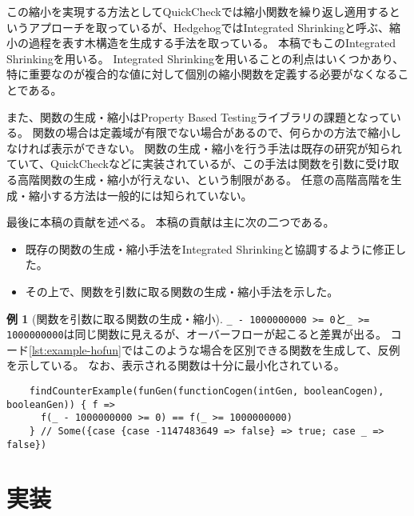 \documentclass[submit,PRO]{ipsj}
\theoremstyle{definition}
\newtheorem{example}{例}
\begin{document}
この縮小を実現する方法としてQuickCheckでは縮小関数を繰り返し適用するというアプローチを取っているが、Hedgehog\cite{hedgehog_online}ではIntegrated Shrinkingと呼ぶ、縮小の過程を表す木構造を生成する手法を取っている。
本稿でもこのIntegrated Shrinkingを用いる。
Integrated Shrinkingを用いることの利点はいくつかあり、特に重要なのが複合的な値に対して個別の縮小関数を定義する必要がなくなることである。

また、関数の生成・縮小はProperty Based Testingライブラリの課題となっている。
関数の場合は定義域が有限でない場合があるので、何らかの方法で縮小しなければ表示ができない。
関数の生成・縮小を行う手法は既存の研究\cite{claessen_shrinking_2012,koopman_automatic_2006}が知られていて、QuickCheckなどに実装されているが、この手法は関数を引数に受け取る高階関数の生成・縮小が行えない、という制限がある。
任意の高階高階を生成・縮小する方法は一般的には知られていない。

最後に本稿の貢献を述べる。
本稿の貢献は主に次の二つである。

\begin{itemize}
  \item 既存の関数の生成・縮小手法をIntegrated Shrinkingと協調するように修正した。
  \item その上で、関数を引数に取る関数の生成・縮小手法を示した。
\end{itemize}

\begin{example}[関数を引数に取る関数の生成・縮小]\label{exm:shrink}
\texttt{\_ - 1000000000 >= 0}と\texttt{\_ >= 1000000000}は同じ関数に見えるが、オーバーフローが起こると差異が出る。
コード\ref{lst:example-hofun}ではこのような場合を区別できる関数を生成して、反例を示している。
なお、表示される関数は十分に最小化されている。

\begin{listing*}[htb]
  \begin{verbatim}
    findCounterExample(funGen(functionCogen(intGen, booleanCogen), booleanGen)) { f =>
      f(_ - 1000000000 >= 0) == f(_ >= 1000000000)
    } // Some({case {case -1147483649 => false} => true; case _ => false})
  \end{verbatim}
  \caption{関数を引数に取る関数の生成・縮小の例}
  \label{lst:example-hofun}
  \end{listing*}
\end{example}

\section{実装}
\end{document}
